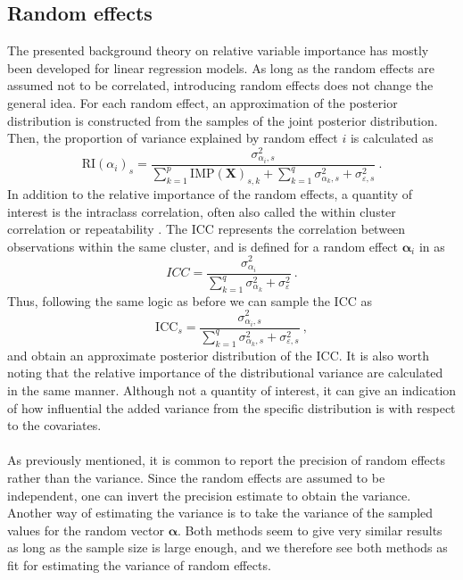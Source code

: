 \subsection{Random effects}
The presented background theory on relative variable importance has mostly been developed for linear regression models. As long as the random effects are assumed not to be correlated, introducing random effects does not change the general idea. For each random effect, an approximation of the posterior distribution is constructed from the samples of the joint posterior distribution. Then, the proportion of variance explained by random effect $i$ is calculated as 
\begin{equation}
    \label{eq:RI_alpha}
    \text{RI}(\alpha_i)_{s} = \frac{\sigma_{\alpha_i, s}^2}{\sum_{k=1}^{p}\text{IMP}(\mathbf{X})_{s, k} + \sum_{k=1}^q \sigma_{\alpha_k, s}^2 + \sigma_{\varepsilon, s}^2} \ .
\end{equation}
In addition to the relative importance of the random effects, a quantity of interest is the intraclass correlation, often also called the within cluster correlation or repeatability \citep{GLMM_book}. The ICC represents the correlation between observations within the same cluster, and is defined for a random effect $\boldsymbol{\alpha}_i$ in \citep{nakagawa2017} as
\begin{equation}
    ICC = \frac{\sigma_{\alpha_i}^2}{\sum_{k=1}^{q}\sigma_{\alpha_k}^2 + \sigma_{\varepsilon}^2} \ .
\end{equation}
Thus, following the same logic as before we can sample the ICC as 
\begin{equation}
    \text{ICC}_s = \frac{\sigma_{\alpha_i, s}^2}{\sum_{k=1}^{q}\sigma_{\alpha_k, s}^2 + \sigma_{\varepsilon, s}^2} \ ,
\end{equation}
and obtain an approximate posterior distribution of the ICC. It is also worth noting that the relative importance of the distributional variance are calculated in the same manner. Although not a quantity of interest, it can give an indication of how influential the added variance from the specific distribution is with respect to the covariates.
\\
\\
As previously mentioned, it is common to report the precision of random effects rather than the variance. Since the random effects are assumed to be independent, one can invert the precision estimate to obtain the variance. Another way of estimating the variance is to take the variance of the sampled values for the random vector $\boldsymbol{\alpha}$. Both methods seem to give very similar results as long as the sample size is large enough, and we therefore see both methods as fit for estimating the variance of random effects.

